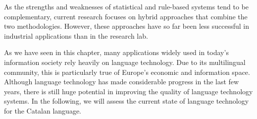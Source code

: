 \begin{multicols}{2}
    As the strengths and weaknesses of statistical and rule-based systems tend to be complementary, current research focuses on hybrid approaches that combine the two methodologies. However, these approaches have so far been less successful in industrial applications than in the research lab. 

    As we have seen in this chapter, many applications widely used in today’s information society rely heavily on language technology. Due to its multilingual community, this is particularly true of Europe’s economic and information space. Although language technology has made considerable progress in the last few years, there is still huge potential in improving the quality of language technology systems. In the following, we will assess the current state of language technology for the Catalan language.
\end{multicols}

\clearpage


